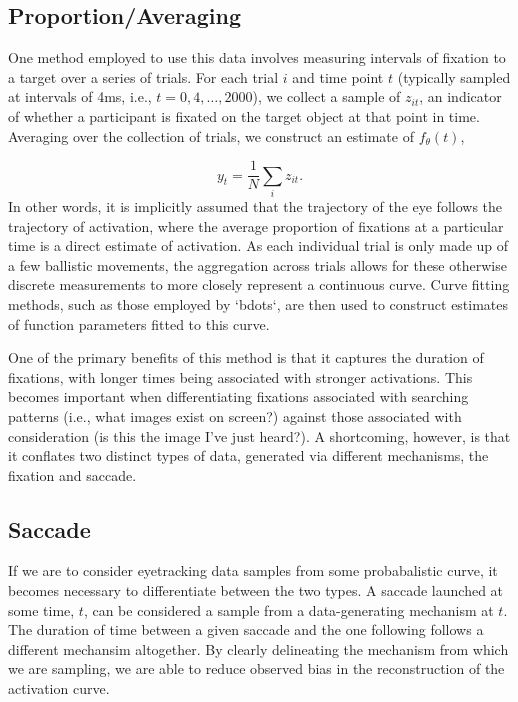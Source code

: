 \documentclass{article}
\begin{document}
\subsection{Proportion/Averaging}


One method employed to use this data involves measuring intervals of fixation to a target over a series of trials. For each trial $i$ and time point $t$ (typically sampled at intervals of 4ms, i.e., $t = 0, 4, \dots, 2000$), we collect a sample of $z_{it}$, an indicator of whether a participant is fixated on the target object at that point in time. Averaging over the collection of trials, we construct an estimate of $f_{\theta}(t)$, 

$$
y_t = \frac{1}{N} \sum_{i} z_{it}.
$$
In other words, it is implicitly assumed that the trajectory of the eye follows the trajectory of activation, where the average proportion of fixations at a particular time is a direct estimate of activation. As each individual trial is only made up of a few ballistic movements, the aggregation across trials allows for these otherwise discrete measurements to more closely represent a continuous curve. Curve fitting methods, such as those employed by `bdots`, are then used to construct estimates of function parameters fitted to this curve.

One of the primary benefits of this method is that it captures the duration of fixations, with longer times being associated with stronger activations. This becomes important when differentiating fixations associated with searching patterns (i.e., what images exist on screen?) against those associated with consideration (is this the image I've just heard?). A shortcoming, however, is that it conflates two distinct types of data, generated via different mechanisms, the fixation and saccade. 

\subsection{Saccade}

If we are to consider eyetracking data samples from some probabalistic curve, it becomes necessary to differentiate between the two types. A saccade launched at some time, $t$, can be considered a sample from a data-generating mechanism at $t$. The duration of time between a given saccade and the one following follows a different mechansim altogether. By clearly delineating the mechanism from which we are sampling, we are able to reduce observed bias in the reconstruction of the activation curve.
\end{document}
